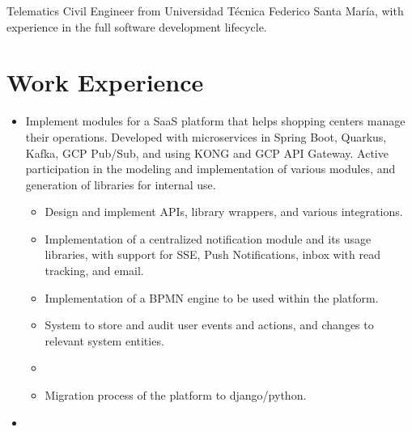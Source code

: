 \documentclass[11pt,letterpaper,sans]{moderncv}        %
\begin{document}
\makecvtitle

\small{Telematics Civil Engineer from Universidad Técnica Federico Santa María, with experience in the full software development lifecycle.}


\section{Work Experience}

\vspace{4pt}

\begin{itemize}

\item{
{\vspace{3pt}
Implement modules for a SaaS platform that helps shopping centers manage their operations. Developed with microservices in Spring Boot, Quarkus, Kafka, GCP Pub/Sub, and using KONG and GCP API Gateway. Active participation in the modeling and implementation of various modules, and generation of libraries for internal use.
\begin{itemize}
\item Design and implement APIs, library wrappers, and various integrations.
\item Implementation of a centralized notification module and its usage libraries, with support for SSE, Push Notifications, inbox with read tracking, and email.
\item Implementation of a BPMN engine to be used within the platform.
\item System to store and audit user events and actions, and changes to relevant system entities.\item
\item Migration process of the platform to django/python.
\end{itemize}
}}

\vspace{6pt}

\item{}


\end{itemize}
\end{document}
